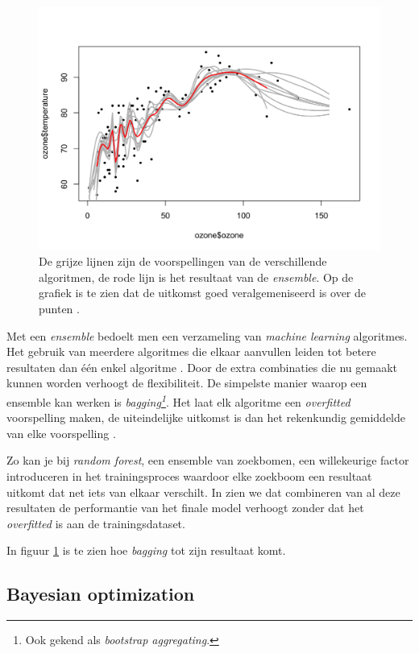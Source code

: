 \begin{figure}
    \includegraphics[width=\linewidth]{img/Ozone.png}
    \caption{De grijze lijnen zijn de voorspellingen van de verschillende algoritmen, de rode lijn is het resultaat van de \textit{ensemble}. Op de grafiek is te zien dat de uitkomst goed veralgemeniseerd is over de punten \autocite{Cen2016}.}
    \label{fig:ensemble-ozone}
\end{figure}

Met een \textit{ensemble} bedoelt men een verzameling van \textit{machine learning} algoritmes. Het gebruik van meerdere algoritmes die elkaar aanvullen leiden tot betere resultaten dan één enkel algoritme \autocite{Opitz1999}. Door de extra combinaties die nu gemaakt kunnen worden verhoogt de flexibiliteit. De simpelste manier waarop een ensemble kan werken is \textit{bagging\footnote{Ook gekend als \textit{bootstrap aggregating}.}}. Het laat elk algoritme een \textit{overfitted} voorspelling maken, de uiteindelijke uitkomst is dan het rekenkundig gemiddelde van elke voorspelling \autocite{Decorte2019}. 

Zo kan je bij \textit{random forest}, een ensemble van zoekbomen, een willekeurige factor introduceren in het trainingsproces waardoor elke zoekboom een resultaat uitkomt dat net iets van elkaar verschilt. In \textcite{Decorte2019} zien we dat combineren van al deze resultaten de performantie van het finale model verhoogt zonder dat het \textit{overfitted} is aan de trainingsdataset.

In figuur \ref{fig:ensemble-ozone} is te zien hoe \textit{bagging} tot zijn resultaat komt.

\subsection{Bayesian optimization}
\label{subsec:bayesian}


